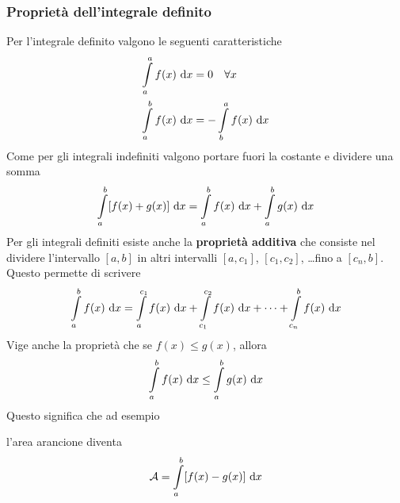 \subsubsection{Proprietà dell'integrale definito}
Per l'integrale definito valgono le seguenti caratteristiche
\begin{align*}
  \int\limits_a^a f(x)\,\mathop{}\!\mathrm{d} x &= 0\quad\forall x\\
  \int\limits_{a}^{b} f(x)\,\mathop{}\!\mathrm{d} x &= - \int\limits_{b}^{a} f(x)\,\mathop{}\!\mathrm{d} x
\end{align*}
Come per gli integrali indefiniti valgono portare fuori la costante e dividere una somma
\begin{equation*}
  \int\limits_{a}^{b} [f(x)+g(x)]\,\mathop{}\!\mathrm{d} x = \int\limits_{a}^{b} f(x)\,\mathop{}\!\mathrm{d} x + 
  \int\limits_{a}^{b} g(x)\,\mathop{}\!\mathrm{d} x
\end{equation*}
Per gli integrali definiti esiste anche la \textbf{proprietà additiva} che consiste nel dividere
l'intervallo $[a,b]$ in altri intervalli $[a,c_1]$, $[c_1,c_2]$, \ldots fino a $[c_n,b]$. Questo
permette di scrivere
\begin{equation*}
  \int\limits_{a}^{b} f(x)\,\mathop{}\!\mathrm{d} x = \int\limits_{a}^{c_1} f(x)\,\mathop{}\!\mathrm{d} x + 
  \int\limits_{c_1}^{c_2} f(x)\,\mathop{}\!\mathrm{d} x + \dotsb + \int\limits_{c_n}^{b} f(x)\,\mathop{}\!\mathrm{d} x
\end{equation*}
Vige anche la proprietà che se $f(x)\leq g(x)$, allora
\begin{equation*}
  \int\limits_{a}^{b} f(x)\,\mathop{}\!\mathrm{d} x \leq \int\limits_{a}^{b} g(x)\,\mathop{}\!\mathrm{d} x
\end{equation*}
Questo significa che ad esempio
\begin{center}
\end{center}
l'area arancione diventa
\begin{equation*}
  \mathcal{A} = \int\limits_{a}^{b} [f(x)-g(x)]\,\mathop{}\!\mathrm{d} x
\end{equation*}
